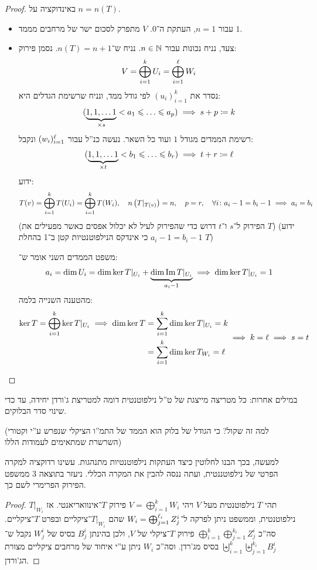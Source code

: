 \documentclass[name=רשימות אלגברה לינארית 2א]{../../../tex/classes/megasumPreamble}
\begin{document}
	\begin{proof}
		באינדוקציה על $n  = n(T)$. 
		\begin{itemize}
			\item עבור $n = 1$, העתקת ה־‏$0$. $V$ מתפרק לסכום ישר של מרחבים מממד $1$. 
			\item צעד, נניח נכונות עבור $n \in \mathbb{N}$. נניח ש־$n(T) = n + 1$. נסמן פירוק: 
			\[ V = \bigoplus_{i = 1}^{k} U_i = \bigoplus_{i = 1}^{\ell} W_i \]
			נסדר את $(u_i)_{i =1}^{k}$ לפי גודל ממד, ונניח שרשימת הגדלים היא: 
			\[ (\underbrace{1, 1, \dots 1 }_{\times s}< a_1 \le \dots \le a_{p}) \implies s + p \cod k \]
			רשימת הממדים מגודל $1$ ועוד כל השאר. נעשה כנ''ל עבור $(w_i)_{i = 1}^{\ell}$ ונקבל: 
			\[ (\underbrace{1, 1, \dots 1}_{\times t} < b_1 \le \dots \le b_r) \implies t + r \cod \ml \]
			ידוע:
			\[ T(v) = \bigoplus_{i = 1}^{k} T(U_i) = \bigoplus_{i = 1}^{k} T(W_i), \quad n\left ( T|_{{T(v)}} \right ) = n, \quad p = r, \quad \forall i \colon a_i - 1 = b_i - 1 \implies a_i = b_i \]
			(הפירוק ל־$s$ ו־$t$ דרוש כדי שהפירוק לעיל לא יכלול אפסים כאשר מפעילים את $T$)
			(ידוע $a_i - 1 = b_i - 1$ כי אינדקס הנילפוטנטיות קטן ב־1 בהחלת $T$)
			
			משפט הממדים השני אומר ש־: 
			\[ a_i = \dim U_i = \dim \ker T|_{{U_i}} + \underbrace{\dim \operatorname{Im} T|_{{U_i}}}_{a_i - 1} \implies \dim \ker T|_{{U_i}} = 1 \]
			מהטענה השנייה בלמה: 
			\[ \begin{aligned}
				\ker T = \bigoplus_{i = 1}^{k} \ker T|_{{U_i}} \implies \dim \ker T &= \sum_{i = 1}^k \dim \ker T|_{{U_i}} = k \\
				&= \sum_{i = 1}^{k} \dim \ker T_{W_i} = \ell
			\end{aligned}\implies k = \ell \implies s = t \]
		\end{itemize}\envendproof
	\end{proof}
	
	במילים אחרות: כל מטריצה מייצגת של ט''ל נילפוטנטית דומה למטריצת ג'ורדן יחידה, עד כדי שינוי סדר הבלוקים. 
	
	(למה זה שקול? כי הגודל של בלוק הוא הממד של התמ''ו הציקלי שנפרש ע''י וקטורי השרשרת שמתאימים לעמודות הללו)
	
	למעשה, בכך הבנו לחלוטין כיצד העתקות נילפוטנטיות מתנהגות. עשינו רדוקציה למקרה הפרטי של נילפוטננטית, ועתה ננסה להבין את המקרה הכללי. ניעזר בתוצאה 3 ממשפט הפירוק הפרימרי לשם כך. 
	
	\begin{proof}
		תהי $T$ נילפוטנטית מעל $V$ ויהי $V = \bigoplus_{i = 1}^{k} W_i$ פירוק $T$־אינוואריאנטי. אז $T|_{W_i}$ נילפוטנטית, וממשפט ניתן לפרקה ל־$W_i = \bigoplus_{j = 1}^{\ell_i} Z^{i}_j$ שהם $T|_{W_i}$־ציקליים ובפרט $T$־ציקליים. סה''כ $\bigoplus_{i = 1}^{k}\bigoplus_{j = 1}^{k_i} Z_j^{i}$ פירוק $T$־ציקלי של $V$, ולכן בהינתן $B^{i}_j$ בסיס של $W^{i}_j$ נקבל ש־$\biguplus_{i = 1}^{k}\biguplus_{j = 1}^{k_i} B^{i}_j$ בסיס מג'רדן. וסה''כ $W_i$ ניתן ע''י איחוד של מרחבים ציקליים מצורת הג'ורדן. 
	\end{proof}
	
\end{document}
